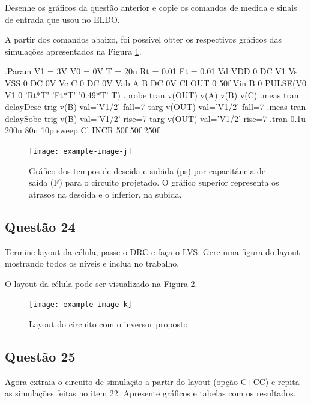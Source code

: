 \documentclass[12pt,a4paper]{article}
\begin{document}
Desenhe os gráficos da questão anterior e copie os comandos de medida e sinais de entrada que usou no ELDO.

A partir dos comandos abaixo, foi possível obter os respectivos gráficos das simulações apresentados na Figura \ref{fig:inverter_delay_graphs}.

\begin{codeblock}[title={Comandos ELDO para Inversor}, label={lst:inverter_eldo_commands}, listing options={language=TeX}]
.Param V1 = 3V V0 = 0V T = 20n Rt = 0.01 Ft = 0.01
Vd VDD 0 DC V1
Vs VSS 0 DC 0V
Vc C 0 DC 0V
Vab A B DC 0V
Cl OUT 0 50f
Vin B 0 PULSE(V0 V1 0 'Rt*T' 'Ft*T' '0.49*T' T)
.probe tran v(OUT) v(A) v(B) v(C)
.meas tran delayDesc trig v(B) val='V1/2' fall=7 targ v(OUT) val='V1/2'
fall=7
.meas tran delaySobe trig v(B) val='V1/2' rise=7 targ v(OUT) val='V1/2'
rise=7
.tran 0.1u 200n 80n 10p sweep Cl INCR 50f 50f 250f
\end{codeblock}

\begin{figure}[H]
    \centering
    \texttt{[image: example-image-j]}
    \caption{Gráfico dos tempos de descida e subida (ps) por capacitância de saída (F) para o circuito projetado. O gráfico superior representa os atrasos na descida e o inferior, na subida.}
    \label{fig:inverter_delay_graphs}
\end{figure}

\subsection*{Questão 24}

Termine layout da célula, passe o DRC e faça o LVS. Gere uma figura do layout mostrando todos os níveis e inclua no trabalho.

O layout da célula pode ser visualizado na Figura \ref{fig:cell_layout}.

\begin{figure}[H]
    \centering
    \texttt{[image: example-image-k]}
    \caption{Layout do circuito com o inversor proposto.}
    \label{fig:cell_layout}
\end{figure}

\subsection*{Questão 25}

Agora extraia o circuito de simulação a partir do layout (opção C+CC) e repita as simulações feitas no item 22. Apresente gráficos e tabelas com os resultados.
\end{document}
